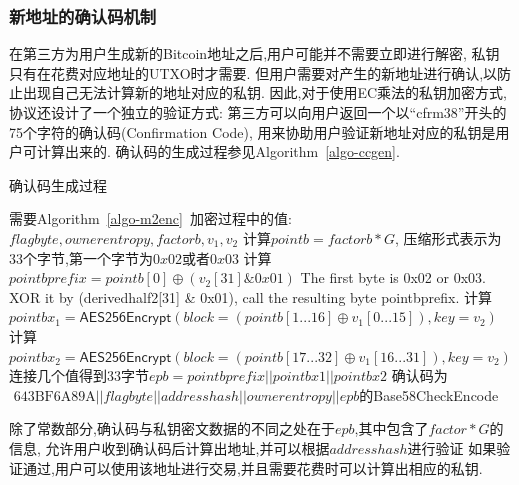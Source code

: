 \subsubsection{新地址的确认码机制}

在第三方为用户生成新的Bitcoin地址之后,用户可能并不需要立即进行解密,
私钥只有在花费对应地址的UTXO时才需要.
但用户需要对产生的新地址进行确认,以防止出现自己无法计算新的地址对应的私钥.
因此,对于使用EC乘法的私钥加密方式,协议还设计了一个独立的验证方式:
第三方可以向用户返回一个以“cfrm38”开头的75个字符的确认码(Confirmation Code),
用来协助用户验证新地址对应的私钥是用户可计算出来的.
确认码的生成过程参见Algorithm~\ref{algo-ccgen}.

\begin{algorithm}[h]\footnotesize
\caption{确认码生成过程}\label{algo-ccgen}
  	\begin{algorithmic}[1]
	   	\STATE 需要Algorithm~\ref{algo-m2enc}~加密过程中的值:$flagbyte, ownerentropy, factorb, v_1, v_2$
		\STATE 计算$pointb = factorb * G$, 压缩形式表示为33个字节,第一个字节为$0x02$或者$0x03$
		\STATE 计算$pointbprefix = pointb[0] \oplus (v_2[31] \& 0x01)$
		 The first byte is 0x02 or 0x03. XOR it by (derivedhalf2[31] \& 0x01), call the resulting byte pointbprefix.
		\STATE 计算$pointbx_1 = \textsf{AES256Encrypt}(block = (pointb[1...16] \oplus v_1[0...15]), key = v_2)$ 
		\STATE 计算$pointbx_2=\textsf{AES256Encrypt}(block = (pointb[17...32] \oplus v_1[16...31]),key = v_2)$
		\STATE 连接几个值得到33字节$epb = pointbprefix || pointbx1 || pointbx2$
		\STATE 确认码为\small{$\text{ 643BF6A89A} || flagbyte || addresshash || ownerentropy || epb$}的\textsf{Base58CheckEncode}
\end{algorithmic}
\end{algorithm}

除了常数部分,确认码与私钥密文数据的不同之处在于$epb$,其中包含了$factor*G$的信息,
允许用户收到确认码后计算出地址,并可以根据$addresshash$进行验证
如果验证通过,用户可以使用该地址进行交易,并且需要花费时可以计算出相应的私钥.



